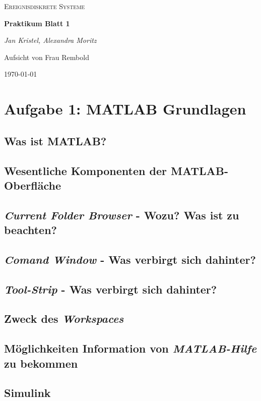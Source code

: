 \documentclass{article}
\begin{document}
	\begin{titlepage}
		\centering
		{\scshape\LARGE
			Ereignisdiskrete Systeme
			\par}
		\vspace{1.5cm}
		{\huge\bfseries Praktikum Blatt 1\par}
		\vspace{1.5cm}
		{\LARGE\itshape Jan Kristel, Alexandra Moritz\par}
		\vfill
			Aufsicht von Frau Rembold\par
			
		\vfill	
			{\large \today \par}	
		
	\end{titlepage}
	
	\tableofcontents
	\newpage
	\section{Aufgabe 1: MATLAB Grundlagen}
		\subsection{Was ist MATLAB?}
		\subsection{Wesentliche Komponenten der MATLAB-Oberfläche}
		\subsection{\textit{Current Folder Browser} - Wozu? Was ist zu beachten?}
		\subsection{\textit{Comand Window} - Was verbirgt sich dahinter?}
		\subsection{\textit{Tool-Strip} - Was verbirgt sich dahinter?}
		\subsection{Zweck des \textit{Workspaces}}
		\subsection{Möglichkeiten Information von \textit{MATLAB-Hilfe} zu bekommen}
		\subsection{Simulink}
\end{document}
